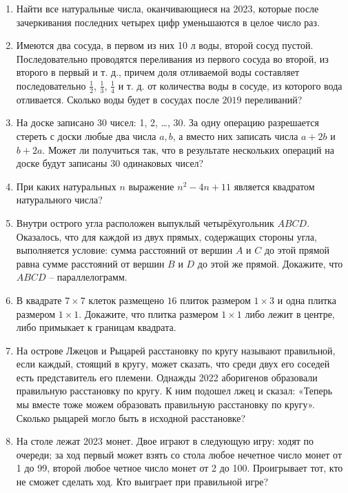 \documentclass{article}
\begin{document}
\begin{enumerate}[label*=\protect\fbox{\arabic{enumi}}]
\item Найти все натуральные числа, оканчивающиеся на 2023, которые после зачеркивания последних четырех цифр уменьшаются в целое число раз.

\item Имеются два сосуда, в первом из них 10 л воды, второй сосуд пустой. Последовательно проводятся переливания из первого сосуда во второй, из второго в первый и т. д., причем доля отливаемой воды составляет последовательно $\frac{1}{2}$, $\frac{1}{3}$, $\frac{1}{4}$ и т. д. от количества воды в сосуде, из которого вода отливается. Сколько воды будет в сосудах после $2019$ переливаний?

\item На доске записано 30 чисел: 1, 2, …, 30. За одну операцию разрешается стереть с доски любые два числа $a, b$, а вместо них записать числа $a + 2b$ и $b + 2a$. Может ли получиться так, что в результате нескольких операций на доске будут записаны 30 одинаковых чисел?

\item При каких натуральных $n$ выражение $n^2 - 4n + 11$ является квадратом натурального числа?

\item Внутри острого угла расположен выпуклый четырёхугольник $ABCD$. Оказалось, что для каждой из двух прямых, содержащих стороны угла, выполняется условие: сумма расстояний от вершин $A$ и $C$ до этой прямой равна сумме расстояний от вершин $B$ и $D$ до этой же прямой. Докажите, что $ABCD$ – параллелограмм.

\item В квадрате $7 \times 7$ клеток размещено $16$ плиток размером $1 \times 3$ и одна плитка размером $1 \times 1$. Докажите, что плитка размером $1 \times 1$ либо лежит в центре, либо примыкает к границам квадрата.

\item На острове Лжецов и Рыцарей расстановку по кругу называют правильной, если каждый, стоящий в кругу, может сказать, что среди двух его соседей есть представитель его племени. Однажды 2022 аборигенов образовали правильную расстановку по кругу. К ним подошел лжец и сказал: «Теперь мы вместе тоже можем образовать правильную расстановку по кругу». Сколько рыцарей могло быть в исходной расстановке?

\item На столе лежат 2023 монет. Двое играют в следующую игру: ходят по очереди; за ход первый может взять со стола любое нечетное число монет от 1 до 99, второй любое четное число монет от 2 до 100. Проигрывает тот, кто не сможет сделать ход. Кто выиграет при правильной игре?


\end{enumerate}
\end{document}
